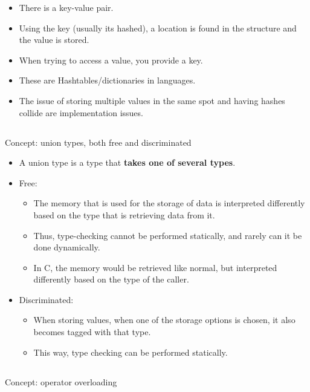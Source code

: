 \begin{itemize}[noitemsep]
\item There is a key-value pair.
\item Using the key (usually its hashed), a location is found in the structure and the value is stored.
\item When trying to access a value, you provide a key.
\item These are Hashtables/dictionaries in languages.
\item The issue of storing multiple values in the same spot and having hashes collide are implementation issues.
\end{itemize}

\subsection{}
Concept: union types, both free and discriminated

\begin{itemize}
\item A union type is a type that \textbf{takes one of several types}.
\item Free:
  \begin{itemize}[noitemsep]
  \item The memory that is used for the storage of data is interpreted differently based on the type that is retrieving data from it.
  \item Thus, type-checking cannot be performed statically, and rarely can it be done dynamically.
  \item In C, the memory would be retrieved like normal, but interpreted differently based on the type of the caller.
  \end{itemize}

\item Discriminated:
  \begin{itemize}[noitemsep]
  \item When storing values, when one of the storage options is chosen, it also becomes tagged with that type.
  \item This way, type checking can be performed statically.
  \end{itemize}
\end{itemize}

\subsection{}
Concept: operator overloading


